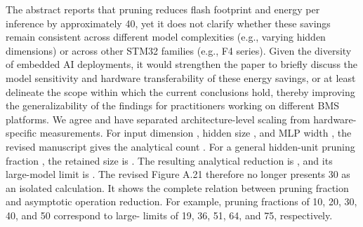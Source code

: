 {}
\markdownRendererSectionEnd \markdownRendererSectionBegin
{}\markdownRendererInterblockSeparator
{}\markdownRendererBlockQuoteBegin
The abstract reports that pruning reduces flash footprint and energy per inference by approximately 40\markdownRendererPercentSign{}, yet it does not clarify whether these savings remain consistent across different model complexities (e.g., varying hidden dimensions) or across other STM32 families (e.g., F4 series). Given the diversity of embedded AI deployments, it would strengthen the paper to briefly discuss the model sensitivity and hardware transferability of these energy savings, or at least delineate the scope within which the current conclusions hold, thereby improving the generalizability of the findings for practitioners working on different BMS platforms.\markdownRendererBlockQuoteEnd \markdownRendererInterblockSeparator
{} We agree and have separated architecture-level scaling from hardware-specific measurements. For input dimension , hidden size , and MLP width , the revised manuscript gives the analytical count\markdownRendererParagraphSeparator
{}.\markdownRendererParagraphSeparator
{}For a general hidden-unit pruning fraction , the retained size is . The resulting analytical reduction is\markdownRendererParagraphSeparator
{},\markdownRendererParagraphSeparator
{}and its large-model limit is . The revised Figure A.21 therefore no longer presents 30\markdownRendererPercentSign{} as an isolated calculation. It shows the complete relation between pruning fraction and asymptotic operation reduction. For example, pruning fractions of 10\markdownRendererPercentSign{}, 20\markdownRendererPercentSign{}, 30\markdownRendererPercentSign{}, 40\markdownRendererPercentSign{}, and 50\markdownRendererPercentSign{} correspond to large- limits of 19\markdownRendererPercentSign{}, 36\markdownRendererPercentSign{}, 51\markdownRendererPercentSign{}, 64\markdownRendererPercentSign{}, and 75\markdownRendererPercentSign{}, respectively.\markdownRendererParagraphSeparator
